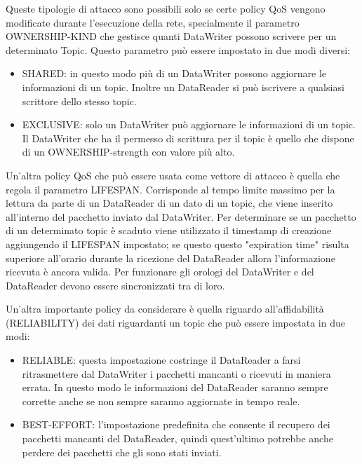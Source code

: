 Queste tipologie di attacco sono possibili solo se certe policy QoS vengono
modificate durante l'esecuzione della rete, specialmente il parametro
OWNERSHIP-KIND che gestisce quanti DataWriter possono scrivere per un
determinato Topic. Questo parametro può essere impostato in due modi diversi:
\begin{itemize}
    \item SHARED: in questo modo più di un DataWriter possono aggiornare le
    informazioni di un topic. Inoltre un DataReader si può iscrivere a
    qualsiasi scrittore dello stesso topic.
    \item EXCLUSIVE: solo un DataWriter può aggiornare le informazioni di un
    topic. Il DataWriter che ha il permesso di scrittura per il topic è quello
    che dispone di un OWNERSHIP-strength con valore più alto.
\end{itemize}


Un'altra policy QoS che può essere usata come vettore di attacco è quella
che regola il parametro LIFESPAN. Corrisponde al tempo limite massimo per la
lettura da parte di un DataReader di un dato di un topic, che viene inserito
all'interno del pacchetto inviato dal DataWriter. Per determinare se un pacchetto
di un determinato topic è scaduto viene utilizzato il timestamp di creazione
aggiungendo il LIFESPAN impostato; se questo questo "expiration time" risulta
superiore all'orario durante la ricezione del DataReader allora l'informazione
ricevuta è ancora valida. Per funzionare gli orologi del DataWriter e del DataReader
devono essere sincronizzati tra di loro.






Un'altra importante policy da considerare è quella riguardo all'affidabilità
(RELIABILITY) dei dati riguardanti un topic che può essere impostata in due
modi:
\begin{itemize}
    \item RELIABLE: questa impostazione costringe il DataReader a farsi
    ritrasmettere dal DataWriter i pacchetti mancanti o ricevuti in maniera errata.
    In questo modo le informazioni del DataReader saranno sempre corrette anche
    se non sempre saranno aggiornate in tempo reale.
    \item BEST-EFFORT: l'impostazione predefinita che consente il recupero
    dei pacchetti mancanti del DataReader, quindi quest'ultimo potrebbe anche
    perdere dei pacchetti che gli sono stati inviati.
\end{itemize}




